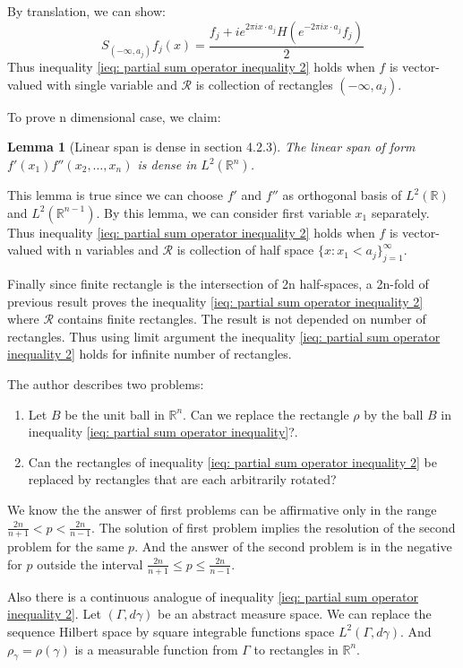 \documentclass{report}
\theoremstyle{definition}
\theoremstyle{definition}
\theoremstyle{plain}
\newtheorem{lemma}[theorem]{Lemma}
\numberwithin{theorem}{section}
\numberwithin{remark}{section}
\numberwithin{equation}{section}
\begin{document}
By translation, we can show:
\begin{equation*}
    S_{(-\infty,a_j)}f_j(x)=\frac{f_j+ie^{2\pi i x\cdot a_j}H(e^{-2\pi i x\cdot a_j}f_j)}{2}
\end{equation*}
Thus inequality \eqref{ieq: partial sum operator inequality 2} holds when $f$ is vector-valued with single variable and $\mathscr{R}$ is collection of rectangles $(-\infty,a_j)$.\par
To prove n dimensional case, we claim:
\begin{lemma}[Linear span is dense in section 4.2.3]
    The linear span of form $f'(x_1)f''(x_2,\dots,x_n)$ is dense in $L^2(\mathbb{R}^n)$.
\end{lemma}
This lemma is true since we can choose $f'$ and $f''$ as orthogonal basis of $L^2(\mathbb{R})$ and $L^2(\mathbb{R}^{n-1})$. By this lemma, we can consider first variable $x_1$ separately. Thus inequality \eqref{ieq: partial sum operator inequality 2} holds when $f$ is vector-valued with n variables and $\mathscr{R}$ is collection of half space $\{x:x_1<a_j\}_{j=1}^\infty$.\par
Finally since finite rectangle is the intersection of 2n half-spaces, a 2n-fold of previous result proves the inequality \eqref{ieq: partial sum operator inequality 2} where $\mathscr{R}$ contains finite rectangles. The result is not depended on number of rectangles. Thus using limit argument the inequality \eqref{ieq: partial sum operator inequality 2} holds for infinite number of rectangles.\par
The author describes two problems:
\begin{enumerate}
    \item Let $B$ be the unit ball in $\mathbb{R}^n$. Can we replace the rectangle $\rho$ by the ball $B$ in inequality \eqref{ieq: partial sum operator inequality}?.
    \item Can the rectangles of inequality \eqref{ieq: partial sum operator inequality 2} be replaced by rectangles that are each arbitrarily rotated?
\end{enumerate}
We know the the answer of first problems can be affirmative only in the range $\frac{2n}{n+1}<p<\frac{2n}{n-1}$. The solution of first problem implies the resolution of the second problem for the same $p$. And the answer of the second problem is in the negative for $p$ outside the interval $\frac{2n}{n+1}\leq p\leq \frac{2n}{n-1}$.\par
Also there is a continuous analogue of inequality \eqref{ieq: partial sum operator inequality 2}. Let $(\Gamma,d\gamma)$ be an abstract measure space. We can replace the sequence Hilbert space by square integrable functions space $L^2(\Gamma,d\gamma)$. And $\rho_\gamma=\rho(\gamma)$ is a measurable function from $\Gamma$ to rectangles in $\mathbb{R}^n$.\par
\end{document}
